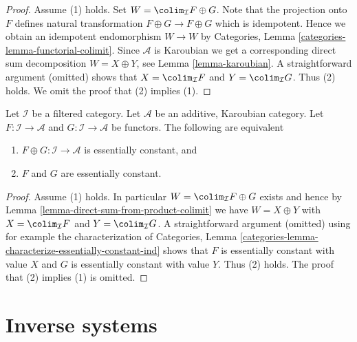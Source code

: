 \begin{proof}
Assume (1) holds. Set $W = \colim_\mathcal{I} F \oplus G$.
Note that the projection onto $F$ defines natural transformation
$F \oplus G \to F \oplus G$ which is idempotent. Hence we obtain
an idempotent endomorphism $W \to W$ by
Categories, Lemma \ref{categories-lemma-functorial-colimit}.
Since $\mathcal{A}$ is Karoubian we get a corresponding direct
sum decomposition $W = X \oplus Y$, see Lemma \ref{lemma-karoubian}.
A straightforward argument (omitted) shows that
$X = \colim_\mathcal{I} F$ and $Y = \colim_\mathcal{I} G$.
Thus (2) holds. We omit the proof that (2) implies (1).
\end{proof}

\begin{lemma}
\label{lemma-direct-sum-from-product-essentially-constant}
Let $\mathcal{I}$ be a filtered category. Let $\mathcal{A}$
be an additive, Karoubian category. Let $F : \mathcal{I} \to \mathcal{A}$ and
$G : \mathcal{I} \to \mathcal{A}$ be functors. The following are equivalent
\begin{enumerate}
\item $F \oplus G : \mathcal{I} \to \mathcal{A}$
is essentially constant, and
\item $F$ and $G$ are essentially constant.
\end{enumerate}
\end{lemma}

\begin{proof}
Assume (1) holds. In particular $W = \colim_\mathcal{I} F \oplus G$ exists
and hence by Lemma \ref{lemma-direct-sum-from-product-colimit}
we have $W = X \oplus Y$ with $X = \colim_\mathcal{I} F$ and
$Y = \colim_\mathcal{I} G$. A straightforward argument (omitted)
using for example the characterization of
Categories, Lemma \ref{categories-lemma-characterize-essentially-constant-ind}
shows that $F$ is essentially constant with value $X$ and $G$ is essentially
constant with value $Y$. Thus (2) holds. The proof that (2) implies (1)
is omitted.
\end{proof}






\section{Inverse systems}
\label{section-inverse-systems}

